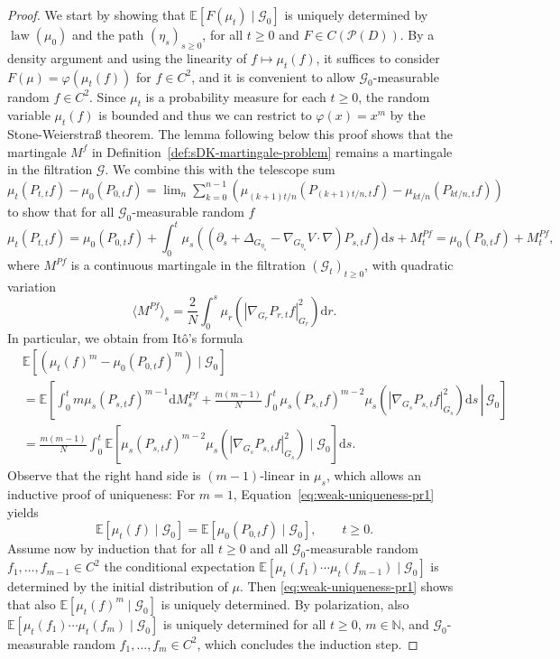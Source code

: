 \documentclass[10pt,a4paper]{amsart}
\newcommand{\cdummy}{\cdot}
\newcommand{\mathd}{\mathrm{d}}
\newcommand{\tmop}[1]{\ensuremath{\operatorname{#1}}}
\begin{document}
\begin{proof}
    We start by showing that $\mathbb{E} [F (\mu_t) \mid \mathcal{G}_0]$ is uniquely
determined by $\tmop{law} (\mu_0)$ and the path $(\eta_s)_{s \geq 0}$,
for all $t \geq 0$ and $F \in C (\mathcal{P} (D))$. By a density
argument and using the linearity of $f \mapsto \mu_t (f)$, it suffices to
consider $F (\mu) = \varphi (\mu_t (f))$ for $f \in C^2$, and it is
convenient to allow $\mathcal{G}_0$-measurable random $f \in C^2$. Since
$\mu_t$ is a probability measure for each $t \geq 0$, the random variable
$\mu_t (f)$ is bounded and thus we can restrict to $\varphi (x) = x^m$ by the
Stone-Weierstra{\ss} theorem. The lemma following below this proof shows that the martingale $M^f$ in Definition~\ref{def:sDK-martingale-problem} remains a martingale in the filtration $\mathcal G$. We combine this with the telescope sum $\mu_t (P_{t, t} f) - \mu_0 (P_{0, t} f) = \lim_n \sum_{k=0}^{n-1}(\mu_{(k+1)t/n} (P_{(k+1)t/n, t} f) - \mu_{kt/n} (P_{kt/n, t} f))$ to show that for all
$\mathcal{G}_0$-measurable random $f$
\[ \mu_t (P_{t, t} f) = \mu_0 (P_{0, t} f) + \int_0^t \mu_s \left(  \left(
   \partial_s + \Delta_{G_{\eta_s}} - \nabla_{G_{\eta_s}} V \cdummy \nabla
   \right) P_{s, t} f \right) \mathd s + M^{P f}_t = \mu_0 (P_{0, t} f) + M^{P
   f}_t, \]
where $M^{P f}$ is a continuous martingale in the filtration
$(\mathcal{G}_t)_{t \geq 0}$, with quadratic variation
\[ \langle M^{P f} \rangle_s = \frac{2}{N} \int_0^s \mu_r (| \nabla_{G_r}
   P_{r, t} f |^2_{G_r}) \mathd r. \]
In particular, we obtain from It{\^o}'s formula
\begin{align} \nonumber
  & \mathbb{E} [(\mu_t (f)^m - \mu_0 (P_{0, t} f)^m) \mid \mathcal{G}_0]\\  \nonumber
  & =\mathbb{E} \left[ \left. \int_0^t m \mu_s (P_{s, t} f)^{m - 1} \mathd
  M^{P f}_s + \frac{m (m - 1)}{N} \int_0^t \mu_s (P_{s, t} f)^{m - 2} \mu_s (|
  \nabla_{G_s} P_{s, t} f |^2_{G_s}) \mathd s \,\right|\, \mathcal{G}_0 \right]\\ \label{eq:weak-uniqueness-pr1}
  & = \frac{m (m - 1)}{N} \int_0^t \mathbb{E} [\mu_s (P_{s, t} f)^{m - 2}
  \mu_s (| \nabla_{G_s} P_{s, t} f |^2_{G_s}) \mid \mathcal{G}_0] \mathd s.
\end{align}
Observe that the right hand side is $(m - 1)$-linear in $\mu_s$, which allows
an inductive proof of uniqueness: For $m = 1$, Equation~\eqref{eq:weak-uniqueness-pr1} yields
\[ \mathbb{E} [\mu_t (f) \mid \mathcal{G}_0] =\mathbb{E} [\mu_0 (P_{0, t} f)
   \mid \mathcal{G}_0], \qquad t \geq 0. \]
Assume now by induction that for all $t \geq 0$ and all
$\mathcal{G}_0$-measurable random $f_1, \ldots, f_{m - 1} \in C^2$ the
conditional expectation $\mathbb{E} [\mu_t (f_1) \cdots \mu_t (f_{m - 1})
\mid\mathcal{G}_0]$ is determined by the initial distribution of $\mu$. Then \eqref{eq:weak-uniqueness-pr1} shows that also $\mathbb{E} [\mu_t (f)^m
\mid\mathcal{G}_0]$ is uniquely determined. By
polarization, also $\mathbb{E} [\mu_t (f_1) \cdots \mu_t (f_m)
\mid\mathcal{G}_0]$ is uniquely determined for all $t \geq 0$, $m \in
\mathbb{N}$, and $\mathcal{G}_0$-measurable random $f_1, \ldots, f_m \in C^2$, which concludes the induction step.


\end{proof}
\end{document}
